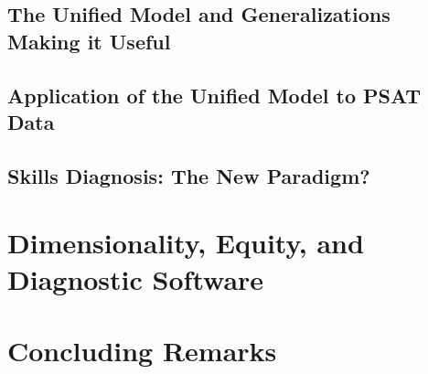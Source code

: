 \documentclass[titlepage,11pt,twoside]{article}
\begin{document}
\subsection{The Unified Model and Generalizations Making it Useful}



\subsection{Application of the Unified Model to PSAT Data}


\subsection{Skills Diagnosis: The New Paradigm?}


\section{Dimensionality, Equity, and Diagnostic Software}


\section{Concluding Remarks}

\vspace{\fill}\clearpage
\end{document}
